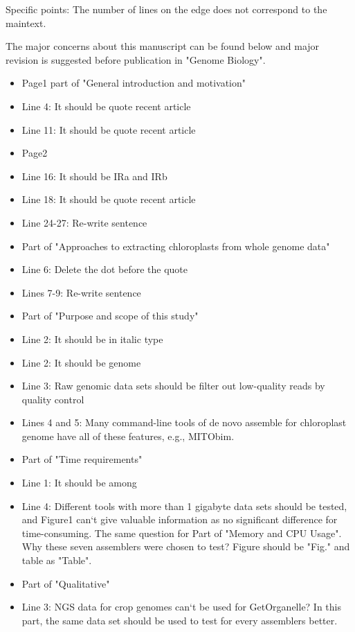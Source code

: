 \documentclass[a4paper,10pt]{scrartcl}
\begin{document}
Specific points: The number of lines on the edge does not correspond to the maintext.

The major concerns about this manuscript can be found below and major revision is suggested before publication in "Genome Biology".

\begin{itemize}
    \item Page1  part of "General introduction and motivation"
    \item Line 4: It should be quote recent article
    \item Line 11: It should be quote recent article
    \item Page2
    \item Line 16: It should be IRa and IRb
    \item Line 18: It should be quote recent article
    \item Line 24-27: Re-write sentence
    \item Part of "Approaches to extracting chloroplasts from whole genome data"
    \item Line 6: Delete the dot before the quote
    \item Lines 7-9: Re-write sentence
    \item Part of "Purpose and scope of this study"
    \item Line 2: It should be in italic type
    \item Line 2: It should be genome
    \item Line 3: Raw genomic data sets should be filter out low-quality reads by quality control
    \item Lines 4 and 5: Many command-line tools of de novo assemble for chloroplast genome have all of these features, e.g., MITObim.
    \item Part of "Time requirements"
    \item Line 1: It should be among
    \item Line 4: Different tools with more than 1 gigabyte data sets should be tested, and Figure1 can`t give valuable information as no significant difference for time-consuming. The same question for Part of "Memory and CPU Usage". Why these seven assemblers were chosen to test? Figure should be "Fig." and table as "Table".
    \item Part of "Qualitative"
    \item Line 3: NGS data for crop genomes can`t be used for GetOrganelle? In this part, the same data set should be used to test for every assemblers better.

\end{itemize}
\end{document}
